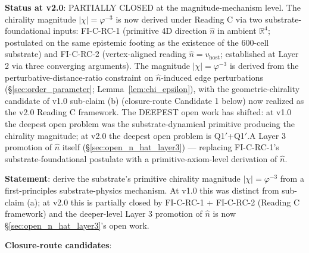 \documentclass[11pt,letterpaper]{article}
\newcommand{\phig}{\varphi}
\begin{document}
\textbf{Status at v2.0}: PARTIALLY CLOSED at the magnitude-mechanism level. The chirality magnitude $|\chi| = \phig^{-3}$ is now derived under Reading C via two substrate-foundational inputs: FI-C-RC-1 (primitive 4D direction $\hat{n}$ in ambient $\mathbb{R}^4$; postulated on the same epistemic footing as the existence of the 600-cell substrate) and FI-C-RC-2 (vertex-aligned reading $\hat{n} = v_{\text{host}}$; established at Layer 2 via three converging arguments). The magnitude $|\chi| = \phig^{-3}$ is derived from the perturbative-distance-ratio constraint on $\hat{n}$-induced edge perturbations (\S\ref{sec:order_parameter}; Lemma~\ref{lem:chi_epsilon}), with the geometric-chirality candidate of v1.0 sub-claim (b) (closure-route Candidate 1 below) now realized as the v2.0 Reading C framework. The DEEPEST open work has shifted: at v1.0 the deepest open problem was the substrate-dynamical primitive producing the chirality magnitude; at v2.0 the deepest open problem is Q1$'$+Q1$'$.A Layer 3 promotion of $\hat{n}$ itself (\S\ref{sec:open_n_hat_layer3}) --- replacing FI-C-RC-1's substrate-foundational postulate with a primitive-axiom-level derivation of $\hat{n}$.

\textbf{Statement}: derive the substrate's primitive chirality magnitude $|\chi| = \phig^{-3}$ from a first-principles substrate-physics mechanism. At v1.0 this was distinct from sub-claim (a); at v2.0 this is partially closed by FI-C-RC-1 + FI-C-RC-2 (Reading C framework) and the deeper-level Layer 3 promotion of $\hat{n}$ is now \S\ref{sec:open_n_hat_layer3}'s open work.

\textbf{Closure-route candidates}:
\end{document}
